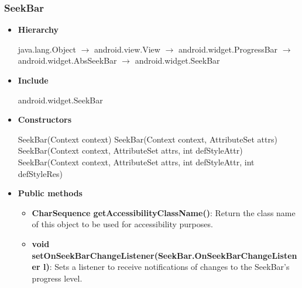 \documentclass{report}
\begin{document}
    \pagebreak 
    \subsubsection{SeekBar}
    \begin{itemize}
        \item \textbf{Hierarchy} 
            \begin{center}
                java.lang.Object $\to$	android.view.View $\to$	android.widget.ProgressBar $\to$	android.widget.AbsSeekBar $\to$	android.widget.SeekBar
            \end{center}
        \item \textbf{Include}
            \bigbreak \noindent 
            \begin{javacode}
            android.widget.SeekBar
            \end{javacode}
        \item \textbf{Constructors}
            \bigbreak \noindent 
            \begin{javacode}
                SeekBar(Context context)
                SeekBar(Context context, AttributeSet attrs)
                SeekBar(Context context, AttributeSet attrs, int defStyleAttr)
                SeekBar(Context context, AttributeSet attrs, int defStyleAttr, int defStyleRes)
            \end{javacode}
        \item \textbf{Public methods}
            \begin{itemize}
                \item \textbf{CharSequence getAccessibilityClassName()}: Return the class name of this object to be used for accessibility purposes.
                \item \textbf{void setOnSeekBarChangeListener(SeekBar.OnSeekBarChangeListener l)}: Sets a listener to receive notifications of changes to the SeekBar's progress level.
            \end{itemize}

    \end{itemize}

    \pagebreak 
\end{document}

